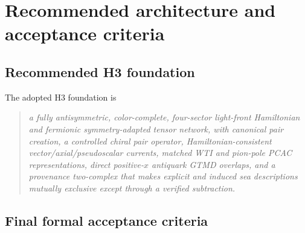 \documentclass[11pt]{article}
\begin{document}
\section{Recommended architecture and acceptance criteria}
\label{sec:acceptance}

\subsection{Recommended H3 foundation}

The adopted H3 foundation is
\begin{quote}
\emph{a fully antisymmetric, color-complete, four-sector light-front
Hamiltonian and fermionic symmetry-adapted tensor network, with canonical
pair creation, a controlled chiral pair operator, Hamiltonian-consistent
vector/axial/pseudoscalar currents, matched WTI and pion-pole PCAC
representations, direct positive-\(x\) antiquark GTMD overlaps, and a
provenance two-complex that makes explicit and induced sea descriptions
mutually exclusive except through a verified subtraction.}
\end{quote}

\subsection{Final formal acceptance criteria}
\end{document}

